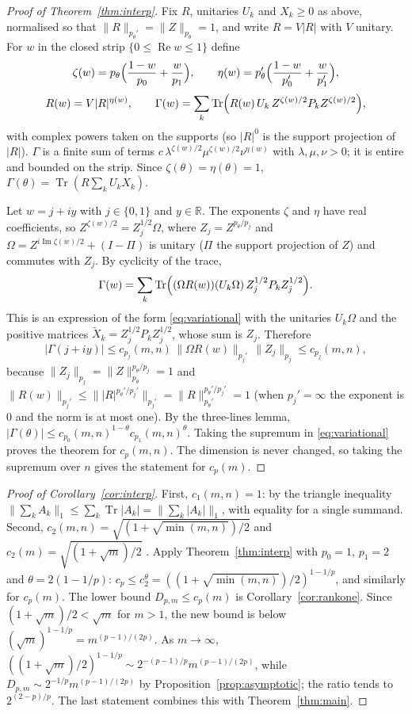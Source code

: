 \documentclass[11pt,a4paper]{article}
\numberwithin{equation}{section}
\theoremstyle{definition}
\theoremstyle{remark}
\DeclareMathOperator{\Tr}{Tr}
\newcommand{\R}{\mathbb R}
\newcommand{\abs}[1]{\left\lvert #1\right\rvert}
\begin{document}
\begin{proof}[Proof of Theorem~\ref{thm:interp}]
Fix \(R\), unitaries \(U_k\) and \(X_k\ge0\) as above, normalised so that
\(\|R\|_{p_\theta'}=\|Z\|_{p_\theta}=1\), and write \(R=V|R|\) with \(V\)
unitary. For \(w\) in the closed strip \(\{0\le\operatorname{Re}w\le1\}\)
define
\[
 \zeta(w)=p_\theta\Bigl(\frac{1-w}{p_0}+\frac{w}{p_1}\Bigr),\qquad
 \eta(w)=p_\theta'\Bigl(\frac{1-w}{p_0'}+\frac{w}{p_1'}\Bigr),
\]
\[
 R(w)=V|R|^{\eta(w)},\qquad
 \Gamma(w)=\sum_k\Tr\Bigl(R(w)\,U_k\,Z^{\zeta(w)/2}P_kZ^{\zeta(w)/2}\Bigr),
\]
with complex powers taken on the supports (so \(|R|^0\) is the support
projection of \(|R|\)). \(\Gamma\) is a finite sum of terms
\(c\,\lambda^{\zeta(w)/2}\mu^{\zeta(w)/2}\nu^{\eta(w)}\) with
\(\lambda,\mu,\nu>0\); it is entire and bounded on the strip. Since
\(\zeta(\theta)=\eta(\theta)=1\), \(\Gamma(\theta)=\Tr(R\sum_kU_kX_k)\).

Let \(w=j+iy\) with \(j\in\{0,1\}\) and \(y\in\R\). The exponents \(\zeta\)
and \(\eta\) have real coefficients, so
\(Z^{\zeta(w)/2}=Z_j^{1/2}\Omega\), where \(Z_j=Z^{p_\theta/p_j}\) and
\(\Omega=Z^{i\operatorname{Im}\zeta(w)/2}+(I-\Pi)\) is unitary
(\(\Pi\) the support projection of \(Z\)) and commutes with \(Z_j\). By
cyclicity of the trace,
\[
 \Gamma(w)=\sum_k\Tr\Bigl((\Omega R(w))(U_k\Omega)\,
 Z_j^{1/2}P_kZ_j^{1/2}\Bigr).
\]
This is an expression of the form \eqref{eq:variational} with the
unitaries \(U_k\Omega\) and the positive matrices
\(\tilde X_k=Z_j^{1/2}P_kZ_j^{1/2}\), whose sum is \(Z_j\). Therefore
\[
 \abs{\Gamma(j+iy)}\le c_{p_j}(m,n)\,\|\Omega R(w)\|_{p_j'}\,\|Z_j\|_{p_j}
 \le c_{p_j}(m,n),
\]
because \(\|Z_j\|_{p_j}=\|Z\|_{p_\theta}^{p_\theta/p_j}=1\) and
\(\|R(w)\|_{p_j'}\le\||R|^{p_\theta'/p_j'}\|_{p_j'}
=\|R\|_{p_\theta'}^{p_\theta'/p_j'}=1\) (when \(p_j'=\infty\) the
exponent is \(0\) and the norm is at most one). By the three-lines lemma,
\(\abs{\Gamma(\theta)}\le c_{p_0}(m,n)^{1-\theta}c_{p_1}(m,n)^\theta\).
Taking the supremum in \eqref{eq:variational} proves the theorem for
\(c_p(m,n)\). The dimension is never changed, so taking the supremum over
\(n\) gives the statement for \(c_p(m)\).
\end{proof}

\begin{proof}[Proof of Corollary~\ref{cor:interp}]
First, \(c_1(m,n)=1\): by the triangle inequality
\(\|\sum_kA_k\|_1\le\sum_k\Tr|A_k|=\|\sum_k|A_k|\|_1\), with equality for a
single summand. Second, \(c_2(m,n)=\sqrt{(1+\sqrt{\min(m,n)})/2}\)
\cite[Theorem 6.2]{Zhang} and \(c_2(m)=\sqrt{(1+\sqrt m)/2}\)
\cite[Theorem 1.1]{TangZhang}. Apply Theorem~\ref{thm:interp} with
\(p_0=1\), \(p_1=2\) and \(\theta=2(1-1/p)\):
\(c_p\le c_2^{\theta}=((1+\sqrt{\min(m,n)})/2)^{1-1/p}\), and similarly
for \(c_p(m)\). The lower bound \(D_{p,m}\le c_p(m)\) is
Corollary~\ref{cor:rankone}. Since \((1+\sqrt m)/2<\sqrt m\) for \(m>1\),
the new bound is below \((\sqrt m)^{1-1/p}=m^{(p-1)/(2p)}\). As
\(m\to\infty\), \(((1+\sqrt m)/2)^{1-1/p}\sim2^{-(p-1)/p}m^{(p-1)/(2p)}\),
while \(D_{p,m}\sim2^{-1/p}m^{(p-1)/(2p)}\) by
Proposition~\ref{prop:asymptotic}; the ratio tends to
\(2^{(2-p)/p}\). The last statement combines this with
Theorem~\ref{thm:main}.
\end{proof}
\end{document}
